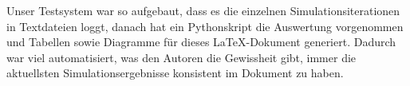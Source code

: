 Unser Testsystem war so aufgebaut, dass es die einzelnen Simulationsiterationen
in Textdateien loggt, danach hat ein Pythonskript die Auswertung vorgenommen und
Tabellen sowie Diagramme für dieses LaTeX-Dokument generiert.
Dadurch war viel automatisiert, was den Autoren die Gewissheit gibt, immer die
aktuellsten Simulationsergebnisse konsistent im Dokument zu haben.